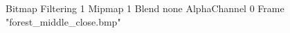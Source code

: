 {Bitmap
	{Filtering 1}
	{Mipmap 1}
	{Blend none}
	{AlphaChannel 0}
	{Frame "forest_middle_close.bmp"}
}
